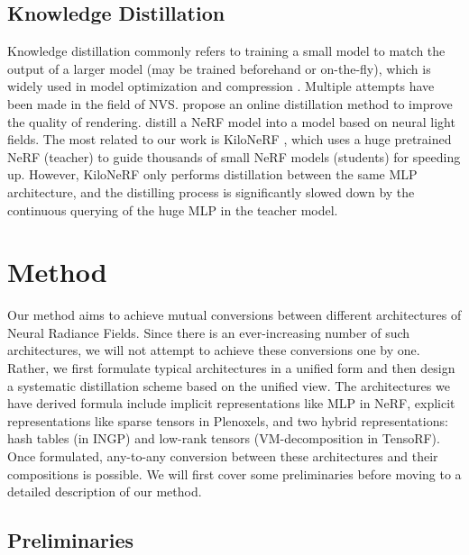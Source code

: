 \documentclass[letterpaper]{article} \usepackage{aaai23}  \usepackage{times}  \usepackage{helvet}  \usepackage{courier}  \usepackage[hyphens]{url}  \usepackage{graphicx} \urlstyle{rm} \def\UrlFont{\rm}  \usepackage{natbib}  \usepackage{caption} \frenchspacing  \setlength{\pdfpagewidth}{8.5in}  \setlength{\pdfpageheight}{11in}  \usepackage{multirow}
\begin{document}
\subsection{Knowledge Distillation}
Knowledge distillation commonly refers to training a small model to match the output of a larger model (may be trained beforehand or on-the-fly), which is widely used in model optimization and compression \cite{hinton2015distilling, gou2021knowledge}. Multiple attempts have been made in the field of NVS. \citeauthor{barron2022mip} propose an online distillation method to improve the quality of rendering. \citeauthor{wang2022r2l} distill a NeRF model into a model based on neural light fields. The most related to our work is KiloNeRF \cite{reiser2021kiloNeRF}, which uses a huge pretrained NeRF (teacher) to guide thousands of small NeRF models (students) for speeding up. However, KiloNeRF only performs distillation between the same MLP architecture, and the distilling process is significantly slowed down by the continuous querying of the huge MLP in the teacher model.


\section{Method}
\label{sec:method}
Our method aims to achieve mutual conversions between different architectures of Neural Radiance Fields. Since there is an ever-increasing number of such architectures, we will not attempt to achieve these conversions one by one. Rather, we first formulate typical architectures in a unified form and then design a systematic distillation scheme based on the unified view. The architectures we have derived formula include implicit representations like MLP in NeRF, explicit representations like sparse tensors in Plenoxels, and two hybrid representations: hash tables (in INGP) and low-rank tensors (VM-decomposition in TensoRF). Once formulated, any-to-any conversion between these architectures and their compositions is possible. We will first cover some preliminaries before moving to a detailed description of our method. 


\subsection{Preliminaries}
\end{document}
